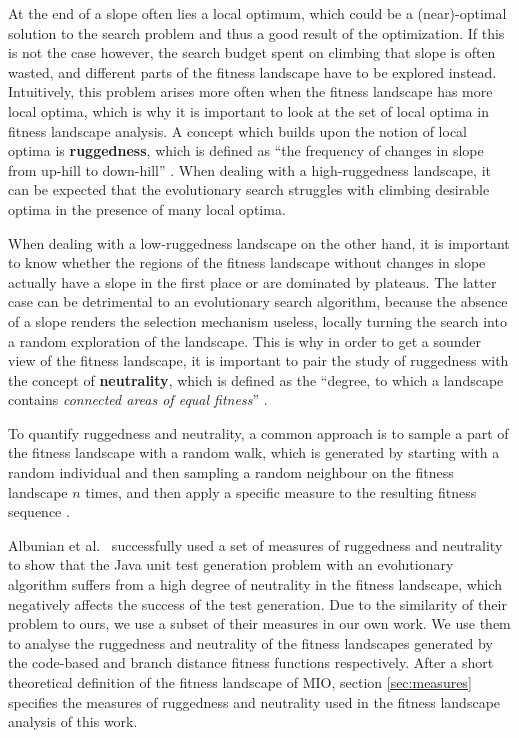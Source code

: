 \documentclass[
  a4paper,  %
  twoside,  %
  bibliography=totoc,
  headsepline,
  cleardoublepage=empty,
  parskip=half,
  draft=false
]{scrbook}
\begin{document}
At the end of a slope often lies a local optimum, which could be a (near)-optimal solution to the search problem and thus a good result of the optimization.
If this is not the case however, the search budget spent on climbing that slope is often wasted, and different parts of the fitness landscape have to be explored instead.
Intuitively, this problem arises more often when the fitness landscape has more local optima, which is why it is important to look at the set of local optima in fitness landscape analysis.
A concept which builds upon the notion of local optima is \textbf{ruggedness}, which is defined as \enquote{the frequency of changes in slope from up-hill to down-hill} \cite{pitzer2012comprehensive}.
When dealing with a high-ruggedness landscape, it can be expected that the evolutionary search struggles with climbing desirable optima in the presence of many local optima.

When dealing with a low-ruggedness landscape on the other hand, it is important to know whether the regions of the fitness landscape without changes in slope actually have a slope in the first place or are dominated by plateaus.
The latter case can be detrimental to an evolutionary search algorithm, because the absence of a slope renders the selection mechanism useless, locally turning the search into a random exploration of the landscape.
This is why in order to get a sounder view of the fitness landscape, it is important to pair the study of ruggedness with the concept of \textbf{neutrality}, which is defined as the \enquote{degree, to which a landscape contains \emph{connected areas of equal fitness}} \cite{albunian2020causes}.

To quantify ruggedness and neutrality, a common approach is to sample a part of the fitness landscape with a random walk, which is generated by starting with a random individual and then sampling a random neighbour on the fitness landscape $n$ times, and then apply a specific measure to the resulting fitness sequence \cite{pitzer2012comprehensive}.

Albunian et al.~\cite{albunian2020causes} successfully used a set of measures of ruggedness and neutrality to show that the Java unit test generation problem with an evolutionary algorithm suffers from a high degree of neutrality in the fitness landscape, which negatively affects the success of the test generation.
Due to the similarity of their problem to ours, we use a subset of their measures in our own work.
We use them to analyse the ruggedness and neutrality of the fitness landscapes generated by the code-based and branch distance fitness functions respectively.
After a short theoretical definition of the fitness landscape of MIO, section \ref{sec:measures} specifies the measures of ruggedness and neutrality used in the fitness landscape analysis of this work.
\end{document}
